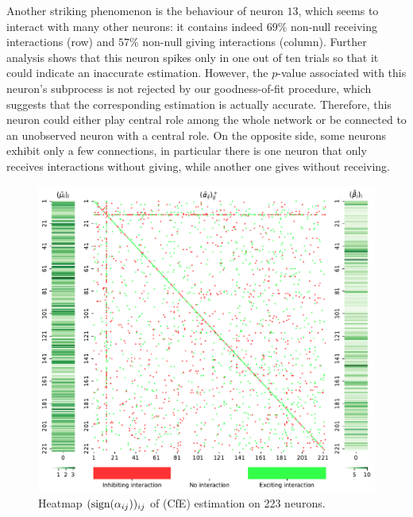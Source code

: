 Another striking phenomenon is the behaviour of neuron $13$, which seems to interact with many other neurons: it contains indeed $69\%$ non-null receiving interactions (row) and $57\%$ non-null giving interactions (column). Further analysis shows that this neuron spikes only in one out of ten trials so that it could indicate an inaccurate estimation. However, the $p$-value associated with this neuron's subprocess is not rejected by our goodness-of-fit procedure, which suggests that the corresponding estimation is actually accurate. Therefore, this neuron could either play central role among the whole network or be connected to an unobserved neuron with a central role. On the opposite side, some neurons exhibit only a few connections, in particular there is one neuron that only receives interactions without giving, while another one gives without receiving.

{\begin{figure}[!ht]
\centering
\includegraphics[width=0.8\linewidth]{images/chapter3/heatmap_mu_beta.pdf}
\caption{Heatmap $(\operatorname{sign}(\alpha_{ij}))_{ij}$ of (CfE) estimation on 223 neurons.}
\label{fig:chap2_heatmap_CfE}
\end{figure}}

